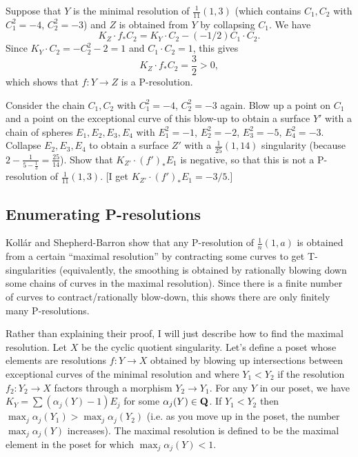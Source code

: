 \documentclass{article}
\begin{document}
\begin{Example}
Suppose that \(Y\) is the minimal resolution of
\(\frac{1}{11}(1,3)\) (which contains \(C_1,C_2\) with \(C_1^2=-4\),
\(C_2^2=-3\)) and \(Z\) is obtained from \(Y\) by collapsing
\(C_1\). We have
\[K_Z\cdot f_*C_2=K_Y\cdot C_2-(-1/2)C_1\cdot C_2.\]
Since \(K_Y\cdot C_2=-C_2^2-2=1\) and \(C_1\cdot C_2=1\), this gives
\[K_Z\cdot f_*C_2=\frac{3}{2}>0,\]
which shows that \(f\colon Y\to Z\) is a P-resolution.


\end{Example}
\begin{Exercise}
Consider the chain \(C_1,C_2\) with \(C_1^2=-4\), \(C_2^2=-3\)
again. Blow up a point on \(C_1\) and a point on the exceptional
curve of this blow-up to obtain a surface \(Y'\) with a chain of
spheres \(E_1,E_2,E_3,E_4\) with \(E_1^2=-1\), \(E_2^2=-2\),
\(E_3^2=-5\), \(E_4^2=-3\). Collapse \(E_2,E_3,E_4\) to obtain a
surface \(Z'\) with a \(\frac{1}{25}(1,14)\) singularity (because
\(2-\frac{1}{5-\frac{1}{3}}=\frac{25}{14}\)). Show that
\(K_{Z'}\cdot (f')_*E_1\) is negative, so that this is not a
P-resolution of \(\frac{1}{11}(1,3)\). [I get \(K_{Z'}\cdot
(f')_*E_1=-3/5\).]
\end{Exercise}
\subsection{Enumerating P-resolutions}


Koll\'{a}r and Shepherd-Barron show {\cite[Lemma 3.13]{KSB}} that any
P-resolution of \(\frac{1}{n}(1,a)\) is obtained from a certain
``maximal resolution'' by contracting some curves to get
T-singularities (equivalently, the smoothing is obtained by rationally
blowing down some chains of curves in the maximal resolution). Since
there is a finite number of curves to contract/rationally blow-down,
this shows there are only finitely many P-resolutions.


Rather than explaining their proof, I will just describe how to find
the maximal resolution. Let \(X\) be the cyclic quotient
singularity. Let's define a poset whose elements are resolutions
\(f\colon Y\to X\) obtained by blowing up intersections between
exceptional curves of the minimal resolution and where \(Y_1<Y_2\) if
the resolution \(f_2\colon Y_2\to X\) factors through a morphism
\(Y_2\to Y_1\). For any \(Y\) in our poset, we have
\(K_{Y}=\sum(\alpha_j(Y)-1)E_j\) for some \(\alpha_j(Y)\in\mathbf{Q}\). If
\(Y_1<Y_2\) then \(\max_j\alpha_j(Y_1)>\max_j\alpha_j(Y_2)\) (i.e. as
you move up in the poset, the number \(\max_j\alpha_j(Y)\)
increases). The maximal resolution is defined to be the maximal
element in the poset for which \(\max_j\alpha_j(Y)<1\).
\end{document}

